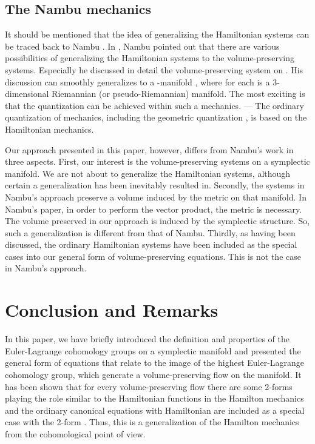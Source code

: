 \documentclass[12pt,a4paper]{article}
\providecommand{\omits}[1]{}
\begin{document}
\subsection{The Nambu mechanics}

It should be mentioned that the idea of generalizing the
Hamiltonian systems can be traced back to Nambu \cite{Nambu}. In
\cite{Nambu}, Nambu pointed out that there are various
possibilities of generalizing the Hamiltonian systems to the
volume-preserving systems. Especially he discussed in detail the
volume-preserving system on \coordHE{}. His discussion can
smoothly generalizes to a \coordHE{}-manifold \coordHE{}, where \coordHE{} for each \coordHE{} is a
3-dimensional Riemannian (or pseudo-Riemannian) manifold. The most
exciting is that the quantization can be achieved within such a
mechanics. --- The ordinary quantization of mechanics, including
the geometric quantization \cite{GQ}, is based on the
Hamiltonian mechanics. %

Our approach presented in this paper, however, differs from
Nambu's work in three aspects. First, our interest  is the
volume-preserving systems on a symplectic manifold. We are not
about to generalize the Hamiltonian systems, although certain a
generalization has been inevitably resulted in. Secondly, the
systems in Nambu's approach preserve a volume induced by the
metric on that manifold. In Nambu's paper, in order to perform the
vector product, the metric is necessary. The volume preserved in
our approach is induced by the symplectic structure. So, such a
generalization is  different from that of Nambu. Thirdly, as
having been discussed, the ordinary Hamiltonian systems have been
included as the special cases into our general form of
volume-preserving equations. This is not the case in Nambu's
approach.


\section{Conclusion and Remarks}

In this paper, we have briefly introduced the definition and
properties of the Euler-Lagrange cohomology groups on a symplectic
manifold \coordHE{} and presented the general form of
equations that relate to the image of the highest Euler-Lagrange
cohomology group, which generate a volume-preserving flow on the
manifold. It has been shown that for every volume-preserving flow
there are
 some 2-forms playing the role similar to the Hamiltonian functions in
the Hamilton mechanics and the ordinary canonical equations with
Hamiltonian \coordHE{} are included as a special case with the 2-form
\coordHE{}. Thus, this is a generalization of the
Hamilton mechanics from the cohomological point of view.\omits{
where \myHighlight{$H$}\coordHE{} is the corresponding Hamiltonian.}
\end{document}
